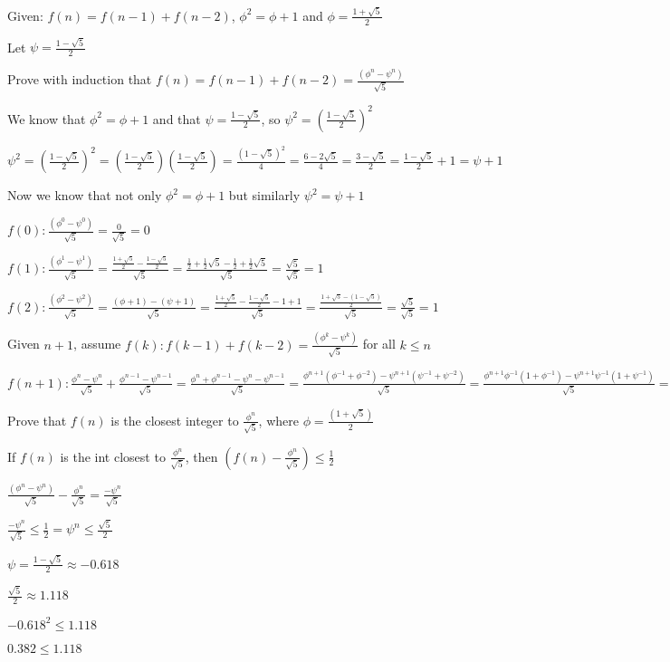 \documentclass{12pt}{article}
\begin{document}
Given: $ f(n) = f(n - 1) + f(n - 2) $,  $ \phi^2 = \phi + 1 $ and $ \phi = \frac{1 + \sqrt{5}}{2} $

Let $ \psi = \frac{1-\sqrt{5}}{2} $

Prove with induction that $ f(n) = f(n - 1) + f(n - 2) = \frac{(\phi^n-\psi^n)}{\sqrt{5}} $

We know that $ \phi^2 = \phi + 1$ and that $\psi = \frac{1-\sqrt{5}}{2}$, so $\psi^2 = (\frac{1-\sqrt{5}}{2})^2 $

$ \psi^2 = (\frac{1-\sqrt{5}}{2})^2 = (\frac{1-\sqrt{5}}{2})(\frac{1-\sqrt{5}}{2}) = \frac{(1-\sqrt{5})^2}{4} = \frac{6-2\sqrt5}{4} = \frac{3-\sqrt{5}}{2} = \frac{1-\sqrt{5}}{2} + 1 = \psi + 1 $

Now we know that not only $ \phi^2 = \phi + 1$ but similarly $\psi^2 = \psi + 1 $

$ f(0): \frac{(\phi^0-\psi^0)}{\sqrt{5}} = \frac{0}{\sqrt{5}} = 0 $

$ f(1): \frac{(\phi^1-\psi^1)}{\sqrt{5}} = \frac{\frac{1 + \sqrt{5}}{2} - \frac{1 - \sqrt{5}}{2}}{\sqrt{5}} = \frac{\frac{1}{2} + \frac{1}{2}\sqrt{5} - \frac{1}{2} + \frac{1}{2}\sqrt{5}}{\sqrt{5}} = \frac{\sqrt{5}}{\sqrt{5}} = 1 $

$ f(2): \frac{(\phi^2-\psi^2)}{\sqrt{5}} = \frac{(\phi + 1) - (\psi + 1)}{\sqrt{5}} = \frac{\frac{1 + \sqrt{5}}{2} - \frac{1 - \sqrt{5}}{2} - 1 + 1}{\sqrt{5}} = \frac{\frac{1 + \sqrt{5} - (1 - \sqrt{5})}{2}}{\sqrt{5}} = \frac{\sqrt{5}}{\sqrt{5}} = 1 $

Given $ n + 1 $, assume $ f(k): f(k - 1) + f(k - 2) = \frac{(\phi^k-\psi^k)}{\sqrt{5}} $ for all $ k \leq n $

$ f(n+1): \frac{\phi^n - \psi^n}{\sqrt{5}} + \frac{\phi^{n - 1} - \psi^{n - 1}}{\sqrt{5}} = \frac{\phi^n + \phi^{n - 1} - \psi^n - \psi^{n - 1}}{\sqrt{5}} = \frac{\phi^{n + 1}(\phi^{-1} + \phi^{-2}) - \psi^{n + 1}(\psi^{-1} + \psi^{-2})}{\sqrt{5}} = \frac{\phi^{n + 1}\phi^{-1}(1 + \phi^{-1}) - \psi^{n + 1}\psi^{-1}(1 + \psi^{-1})}{\sqrt{5}} = \frac{\phi^{n + 1}\phi^{-1}\phi - \psi^{n + 1}\psi^{-1}\psi}{\sqrt{5}} = \frac{\phi^{n + 1} - \psi^{n + 1}}{\sqrt{5}} $

Prove that $ f(n) $ is the closest integer to $ \frac{\phi^n}{\sqrt{5}} $, where $ \phi = \frac{(1 + \sqrt{5})}{2} $

If $ f(n) $ is the int closest to $ \frac{\phi^n}{\sqrt{5}} $, then $ (f(n) - \frac{\phi^n}{\sqrt{5}}) \leq \frac{1}{2} $

$ \frac{(\phi^n-\psi^n)}{\sqrt{5}} - \frac{\phi^n}{\sqrt{5}} = \frac{-\psi^n}{\sqrt{5}} $

$ \frac{-\psi^n}{\sqrt{5}} \leq \frac{1}{2} = \psi^n \leq \frac{\sqrt{5}}{2} $

$ \psi = \frac{1-\sqrt{5}}{2} \approx -0.618 $

$ \frac{\sqrt{5}}{2} \approx 1.118 $

$ -0.618^2 \leq 1.118 $

$ 0.382 \leq 1.118 $
\end{document}
